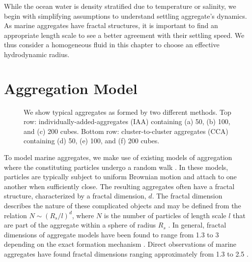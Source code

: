 \par
While the ocean water is density stratified due to temperature or salinity, we begin with simplifying assumptions to understand settling aggregate's dynamics. As marine aggregates have fractal structures, it is important to find an appropriate length scale to see a better agreement with their settling speed. We thus consider a homogeneous fluid in this chapter to choose an effective hydrodynamic radius. 



\section{Aggregation Model}
\label{sec_model}

\begin{figure}[ht]
\begin{center}
\end{center}
\caption{We show typical aggregates as formed by two different methods. Top row: individually-added-aggregates (IAA) containing (a) 50, (b) 100, and (c) 200 cubes. Bottom row: cluster-to-cluster aggregates (CCA) containing (d) 50, (e) 100, and (f) 200 cubes.}
\label{fig_rad_mass}
\end{figure}

To model marine aggregates, we make use of existing models of aggregation where the constituting particles undergo a random walk
\cite{rosenstock_cluster_1980, witten_diffusion-limited_1981,witten_tenuous_1986,kolb_anisotropic_1987}. 
In these models, particles are typically subject to uniform Brownian motion and attach to one another when 
sufficiently close. The resulting aggregates often have a fractal structure, characterized by a fractal dimension, $d$. The fractal dimension describes the nature of these complicated objects and may be defined from the relation $N\sim(R_s/l)^d$, where $N$ is the number of particles of length scale $l$ that are part of the aggregate within a sphere of radius $R_s$ \cite{witten_tenuous_1986}. In general, fractal dimensions of aggregate models have been found to range from 1.3 to 3 depending on the exact formation 
mechanism \cite{witten_diffusion-limited_1981, kolb_anisotropic_1987,gmachowski_calculation_2002}. 
Direct observations of  marine aggregates have found fractal dimensions ranging approximately from 1.3 to 2.5 \cite{alldredge_situ_1988,jackson_aggregation_1998}.
   
